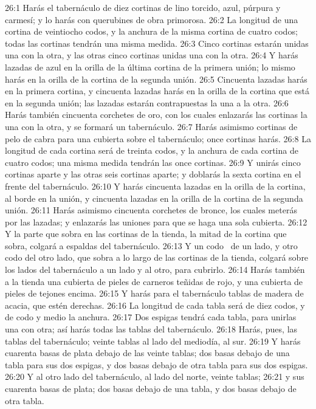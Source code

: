 26:1 Harás el tabernáculo de diez cortinas de lino torcido, azul, púrpura y carmesí; y lo harás con querubines de obra primorosa. 
26:2 La longitud de una cortina de veintiocho codos, y la anchura de la misma cortina de cuatro codos; todas las cortinas tendrán una misma medida. 
26:3 Cinco cortinas estarán unidas una con la otra, y las otras cinco cortinas unidas una con la otra. 
26:4 Y harás lazadas de azul en la orilla de la última cortina de la primera unión; lo mismo harás en la orilla de la cortina de la segunda unión. 
26:5 Cincuenta lazadas harás en la primera cortina, y cincuenta lazadas harás en la orilla de la cortina que está en la segunda unión; las lazadas estarán contrapuestas la una a la otra. 
26:6 Harás también cincuenta corchetes de oro, con los cuales enlazarás las cortinas la una con la otra, y se formará un tabernáculo. 
26:7 Harás asimismo cortinas de pelo de cabra para una cubierta sobre el tabernáculo; once cortinas harás. 
26:8 La longitud de cada cortina será de treinta codos, y la anchura de cada cortina de cuatro codos; una misma medida tendrán las once cortinas. 
26:9 Y unirás cinco cortinas aparte y las otras seis cortinas aparte; y doblarás la sexta cortina en el frente del tabernáculo. 
26:10 Y harás cincuenta lazadas en la orilla de la cortina, al borde en la unión, y cincuenta lazadas en la orilla de la cortina de la segunda unión. 
26:11 Harás asimismo cincuenta corchetes de bronce, los cuales meterás por las lazadas; y enlazarás las uniones para que se haga una sola cubierta. 
26:12 Y la parte que sobra en las cortinas de la tienda, la mitad de la cortina que sobra, colgará a espaldas del tabernáculo. 
26:13 Y un codo  de un lado, y otro codo del otro lado, que sobra a lo largo de las cortinas de la tienda, colgará sobre los lados del tabernáculo a un lado y al otro, para cubrirlo. 
26:14 Harás también a la tienda una cubierta de pieles de carneros teñidas de rojo, y una cubierta de pieles de tejones encima. 
26:15 Y harás para el tabernáculo tablas de madera de acacia, que estén derechas. 
26:16 La longitud de cada tabla será de diez codos, y de codo y medio la anchura. 
26:17 Dos espigas tendrá cada tabla, para unirlas una con otra; así harás todas las tablas del tabernáculo. 
26:18 Harás, pues, las tablas del tabernáculo; veinte tablas al lado del mediodía, al sur. 
26:19 Y harás cuarenta basas de plata debajo de las veinte tablas; dos basas debajo de una tabla para sus dos espigas, y dos basas debajo de otra tabla para sus dos espigas. 
26:20 Y al otro lado del tabernáculo, al lado del norte, veinte tablas; 
26:21 y sus cuarenta basas de plata; dos basas debajo de una tabla, y dos basas debajo de otra tabla. 
